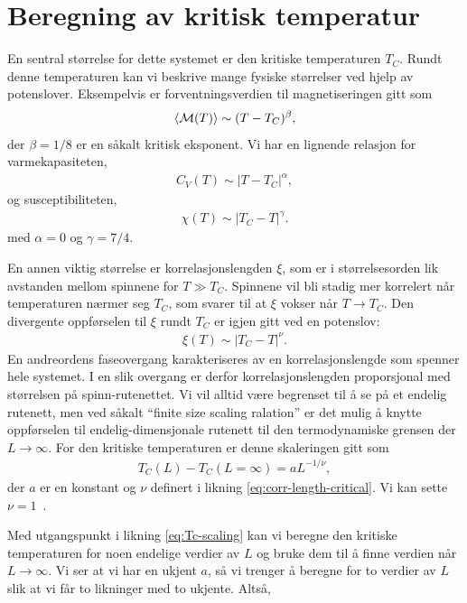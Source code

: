 \documentclass[11pt]{article}
\begin{document}
\section{Beregning av kritisk temperatur}
En sentral størrelse for dette systemet er den kritiske temperaturen
$T_C$. Rundt denne temperaturen kan vi beskrive mange fysiske
størrelser ved hjelp av potenslover. Eksempelvis er
forventningsverdien til magnetiseringen gitt som 
\begin{align}
  \langle \mathcal{M}(T) \rangle \sim (T - T_C)^{\beta},
\end{align}
der $\beta=1/8$ er en såkalt kritisk eksponent. Vi har en lignende
relasjon for varmekapasiteten,
\begin{align}
  C_V(T) \sim |T-T_C|^{\alpha},
\end{align}
og susceptibiliteten,
\begin{align}
  \chi(T) \sim |T_C - T|^{\gamma}.
\end{align}
med $\alpha=0$ og $\gamma=7/4$.

En annen viktig størrelse er korrelasjonslengden $\xi$, som er i
størrelsesorden lik avstanden mellom spinnene for $T\gg T_C$. Spinnene
vil bli stadig mer korrelert når temperaturen nærmer seg $T_C$, som
svarer til at $\xi$ vokser når $T\rightarrow T_C$. Den divergente
oppførselen til $\xi$ rundt $T_C$ er igjen gitt ved en potenslov:
\begin{align}
  \xi(T) \sim |T_C - T|^\nu.\label{eq:corr-length-critical}
\end{align}
En andreordens faseovergang karakteriseres av en korrelasjonslengde
som spenner hele systemet. I en slik overgang er derfor
korrelasjonslengden proporsjonal med størrelsen på
spinn-rutenettet. Vi vil alltid være begrenset til å se på et endelig
rutenett, men ved såkalt ``finite size scaling ralation'' er det mulig
å knytte oppførselen til endelig-dimensjonale rutenett til den
termodynamiske grensen der $L\rightarrow\infty$. For den kritiske
temperaturen er denne skaleringen gitt som 
\begin{align}
  T_C(L) - T_C(L=\infty) = aL^{-1/\nu}\label{eq:Tc-scaling},
\end{align} 
der $a$ er en konstant og $\nu$ definert i likning \eqref{eq:corr-length-critical}.  Vi kan sette
$\nu=1$~\cite{oppgavetekst-prosjekt-4}. 

\vspace{\baselineskip}

Med utgangspunkt i likning \eqref{eq:Tc-scaling} kan vi beregne den
kritiske temperaturen for noen endelige verdier av $L$ og bruke dem
til å finne verdien når $L\rightarrow\infty$. Vi ser at vi har en
ukjent $a$, så vi trenger å beregne for to verdier av $L$ slik at vi
får to likninger med to ukjente. Altså,
\end{document}
